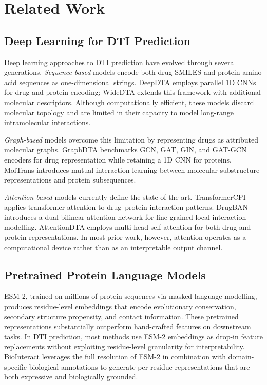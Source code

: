 \documentclass[fleqn,10pt]{wlscirep}
\begin{document}
\section{Related Work}
\label{sec:related}

\subsection{Deep Learning for DTI Prediction}

Deep learning approaches to DTI prediction have evolved through several
generations.\cite{wen2017deep}  \emph{Sequence-based} models encode both
drug SMILES and protein amino acid sequences as one-dimensional strings.
DeepDTA\cite{ozturk2018deepdta} employs parallel 1D CNNs for drug and
protein encoding; WideDTA\cite{ozturk2019widedta} extends this framework
with additional molecular descriptors.  Although computationally efficient, these
models discard molecular topology and are limited in their capacity to model
long-range intramolecular interactions.

\emph{Graph-based} models overcome this limitation by representing drugs as
attributed molecular graphs.  GraphDTA\cite{nguyen2021graphdta} benchmarks
GCN, GAT, GIN, and GAT-GCN encoders for drug representation while retaining a
1D CNN for proteins.  MolTrans\cite{huang2021moltrans} introduces mutual
interaction learning between molecular substructure representations and protein
subsequences.

\emph{Attention-based} models currently define the state of the art.
TransformerCPI\cite{chen2020transformercpi} applies transformer attention to
drug--protein interaction patterns.  DrugBAN\cite{bai2023drugban} introduces
a dual bilinear attention network for fine-grained local interaction modelling.
AttentionDTA\cite{zhao2022attentiondta} employs multi-head self-attention for
both drug and protein representations.  In most prior work, however, attention
operates as a computational device rather than as an interpretable output channel.

\subsection{Pretrained Protein Language Models}

ESM-2,\cite{lin2023evolutionary} trained on millions of protein sequences
via masked language modelling, produces residue-level embeddings that encode
evolutionary conservation, secondary structure propensity, and contact
information.  These pretrained representations substantially outperform
hand-crafted features on downstream tasks.\cite{rives2021biological}  In DTI
prediction, most methods use ESM-2 embeddings as drop-in feature replacements
without exploiting residue-level granularity for interpretability.  BioInteract
leverages the full resolution of ESM-2 in combination with domain-specific
biological annotations to generate per-residue representations that are both
expressive and biologically grounded.
\end{document}
